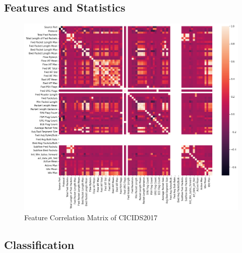 \subsection{Features and Statistics}
\label{subsec:features-statistics}

\textcolor{dimgray}{\lipsum[1]}

\begin{figure}[h!]
    \centering
    \includegraphics[scale=0.5]{assets/figures/chapter3/feature-correlation.png}
    \caption{Feature Correlation Matrix of CICIDS2017}
    \label{fig:feature-correlation}
\end{figure}


\subsection{Classification}
\label{subsec:classification}

\textcolor{dimgray}{\lipsum[1]}

